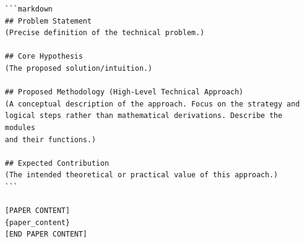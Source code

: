 \begin{verbatim}
```markdown
## Problem Statement
(Precise definition of the technical problem.)

## Core Hypothesis
(The proposed solution/intuition.)

## Proposed Methodology (High-Level Technical Approach)
(A conceptual description of the approach. Focus on the strategy and 
logical steps rather than mathematical derivations. Describe the modules 
and their functions.)

## Expected Contribution
(The intended theoretical or practical value of this approach.)
```

[PAPER CONTENT]
{paper_content}
[END PAPER CONTENT]
\end{verbatim}
